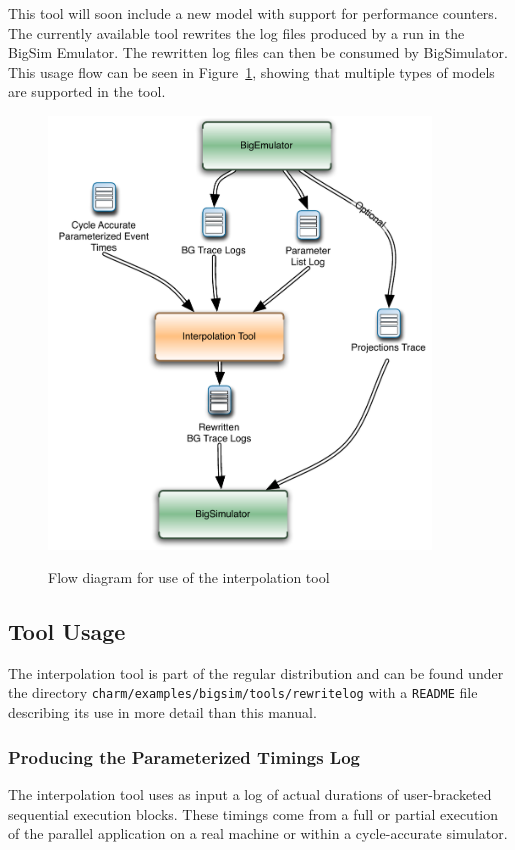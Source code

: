 This tool will soon include a new model with support for performance counters.
The currently available tool rewrites the log files produced by a run in the BigSim Emulator. 
The rewritten log files can then be consumed by BigSimulator. This usage flow can be seen in
Figure~\ref{fig:interpolationflow}, showing that multiple types of models are supported in the tool. 

\begin{figure}[!t]
\centering  
  \includegraphics[width=4in]{figures/InterpolationFlow}
{\sffamily\bfseries\small \caption{Flow diagram for use of the interpolation tool\label{fig:interpolationflow}}}
\end{figure}

\subsection{Tool Usage\label{usage}}

The interpolation tool is part of the regular \charmpp{} distribution and 
can be found under the directory \texttt{charm/examples/bigsim/tools/rewritelog} with a \texttt{README} file describing its use in more detail than this manual.

\subsubsection{Producing the Parameterized Timings Log}
The interpolation tool uses as input a log of actual durations of user-bracketed sequential execution blocks.
These timings come from a full or partial execution of the parallel application on a real machine or
within a cycle-accurate simulator. 

